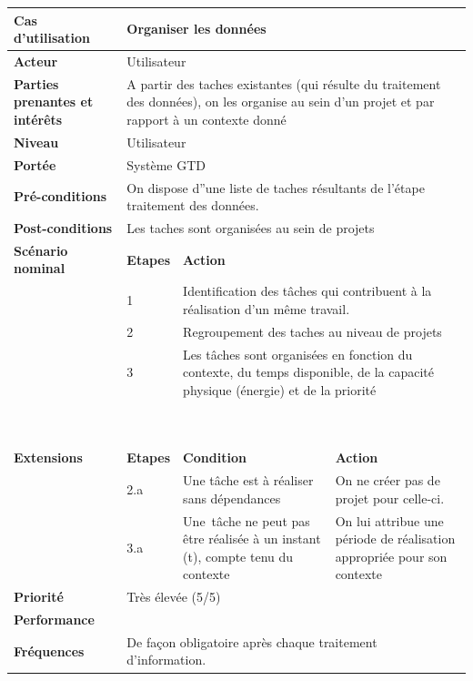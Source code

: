 \begin{center}
\begin{tabular}{|p{1.1in}|p{0.6in}|p{2in}|p{2.0in}|} \hline 
\textbf{Cas d'utilisation }& \multicolumn{3}{|p{3.2in}|}{Organiser les données} \\ \hline 
\textbf{Acteur} & \multicolumn{3}{|p{3.2in}|}{Utilisateur} \\ \hline 
\textbf{Parties 
prenantes et intérêts }& \multicolumn{3}{|p{5in}|}{A partir des taches existantes 
(qui résulte du traitement des données), on les organise au sein d'un projet 
et par rapport à un contexte donné} \\ \hline 
\textbf{Niveau} & \multicolumn{3}{|p{3.2in}|}{Utilisateur} \\ \hline 
\textbf{Portée} & \multicolumn{3}{|p{3.2in}|}{Système GTD} \\ \hline 
\textbf{Pré-conditions} & \multicolumn{3}{|p{5in}|}{On dispose d''une liste de taches résultants 
de l'étape traitement des données.} \\ \hline 
\textbf{Post-conditions} & \multicolumn{3}{|p{5in}|}{Les taches sont organisées au sein 
de projets} \\ \hline 
\textbf{Scénario nominal} & \textbf{Etapes}  & \multicolumn{2}{|p{2.5in}|}{\textbf{Action}} \\ \hline 
~ & 1 & \multicolumn{2}{|p{4in}|}{Identification des tâches qui contribuent à la 
réalisation d'un même travail.} \\ \hline 
~ & 2 & \multicolumn{2}{|p{4in}|}{Regroupement des taches au niveau de projets} \\ \hline 
~ & 3 & \multicolumn{2}{|p{4in}|}{Les 
tâches sont organisées en fonction du contexte, du temps disponible, de la capacité 
physique (énergie) et de la priorité} \\ \hline 
~ & ~ & \multicolumn{2}{|p{2.5in}|}{~} \\ \hline 
~ & ~ & \multicolumn{2}{|p{2.5in}|}{~} \\ \hline 
\textbf{Extensions} & \textbf{Etapes} & \textbf{Condition} & \textbf{Action} \\ \hline 
~ & 2.a & Une tâche est à réaliser sans dépendances & On ne créer pas de projet pour 
celle-ci. \\ \hline 
~ & 3.a & Une~tâche ne peut pas être réalisée à un instant (t), compte tenu du contexte & On 
lui attribue une période de réalisation appropriée pour son contexte \\ \hline 
\textbf{Priorité} & \multicolumn{3}{|p{3.2in}|}{Très élevée (5/5)} \\ \hline 
\textbf{Performance} & \multicolumn{3}{|p{3.2in}|}{~} \\ \hline 
\textbf{Fréquences} & \multicolumn{3}{|p{5in}|}{De façon obligatoire après chaque traitement 
d'information.~} \\ \hline 
\end{tabular}\end{center}



